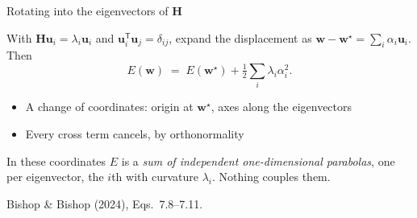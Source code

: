 \documentclass[aspectratio=169, 11pt]{beamer}
\newcommand{\srcline}[1]{%
  \par\vspace{0.25em}%
  {\scriptsize\color{mcMuted}\hfill #1\par}}
\newcommand{\src}[3]{}      %
\begin{document}
\begin{frame}{Rotating into the eigenvectors of $\mathbf{H}$}
  \src{bishop2024}{equation}{7.8-7.11}
  \src{bishop2024}{section}{7.1.1}
  \vspace{0.1em}
  With $\mathbf{H} \mathbf{u}_i = \lambda_i \mathbf{u}_i$ and $\mathbf{u}_i^{\mathsf T} \mathbf{u}_j = \delta_{ij}$,
  expand the displacement as
  $\mathbf{w} - \mathbf{w}^\star = \sum_i \alpha_i \mathbf{u}_i$. Then
  \vspace{-0.35em}
  \[
    E(\mathbf{w}) \;=\; E(\mathbf{w}^\star) + \tfrac12 \sum_i \lambda_i \alpha_i^2 .
  \]
  \vspace{-0.6em}
  \begin{itemize}\itemsep0.35em
    \item A change of coordinates: origin at $\mathbf{w}^\star$, axes along the
          eigenvectors
    \item Every cross term cancels, by orthonormality
  \end{itemize}
  \begin{redhighlight}
    In these coordinates $E$ is a \emph{sum of independent
    one-dimensional parabolas}, one per eigenvector, the $i$th with
    curvature $\lambda_i$. Nothing couples them.
  \end{redhighlight}
  \srcline{Bishop \& Bishop (2024), Eqs.~7.8--7.11.}
\end{frame}
\end{document}

